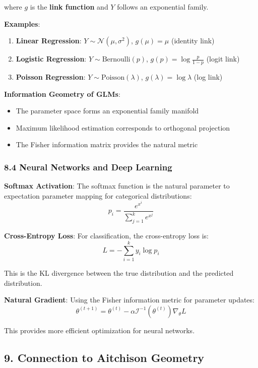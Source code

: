 \documentclass{amsart}
\theoremstyle{plain}
\theoremstyle{definition}
\theoremstyle{remark}
\begin{document}
where $g$ is the \textbf{link function} and $Y$ follows an exponential family.

\textbf{Examples}:

\begin{enumerate}
	\item \textbf{Linear Regression}: $Y \sim \mathcal{N}(\mu, \sigma^2)$, $g(\mu) = \mu$ (identity link)
	\item \textbf{Logistic Regression}: $Y \sim \text{Bernoulli}(p)$, $g(p) = \log\frac{p}{1-p}$ (logit link)
	\item \textbf{Poisson Regression}: $Y \sim \text{Poisson}(\lambda)$, $g(\lambda) = \log \lambda$ (log link)
\end{enumerate}

\textbf{Information Geometry of GLMs}:

\begin{itemize}
	\item The parameter space forms an exponential family manifold
	\item Maximum likelihood estimation corresponds to orthogonal projection
	\item The Fisher information matrix provides the natural metric
\end{itemize}

\subsubsection{8.4 Neural Networks and Deep Learning}

\textbf{Softmax Activation}:
The softmax function is the natural parameter to expectation parameter mapping for categorical distributions:
\[
p_i = \frac{e^{x^i}}{\sum_{j=1}^k e^{x^j}}
\]

\textbf{Cross-Entropy Loss}:
For classification, the cross-entropy loss is:
\[
L = -\sum_{i=1}^k y_i \log p_i
\]

This is the KL divergence between the true distribution and the predicted distribution.

\textbf{Natural Gradient}:
Using the Fisher information metric for parameter updates:
\[
\theta^{(t+1)} = \theta^{(t)} - \alpha \mathcal{I}^{-1}(\theta^{(t)}) \nabla_\theta L
\]

This provides more efficient optimization for neural networks.

\subsection{9. Connection to Aitchison Geometry}
\end{document}
